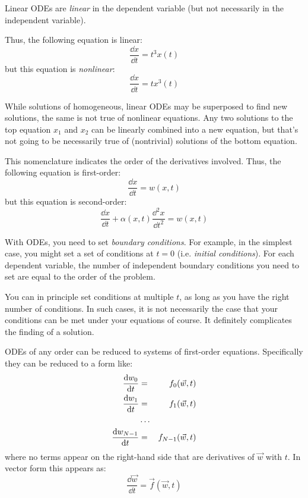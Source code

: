 \begin{answer}
Linear ODEs are {\it linear} in the dependent variable (but not necessarily
in the independent variable). 

Thus, the following equation is linear:
\begin{equation}
\frac{\dd{x}}{\dd{t}} = t^3 x(t)
\end{equation}
but this equation is {\it nonlinear}:
\begin{equation}
\frac{\dd{x}}{\dd{t}} = t x^3(t)
\end{equation}

While solutions of homogeneous, linear ODEs may be superposed to find
new solutions, the same is not true of nonlinear equations.  Any two
solutions to the top equation $x_1$ and $x_2$ can be linearly combined
into a new equation, but that's not going to be necessarily true of
(nontrivial) solutions of the bottom equation.
\end{answer}


\begin{answer}
This nomenclature indicates the order of the derivatives involved.
Thus, the following equation is first-order:
\begin{equation}
\frac{\dd{x}}{\dd{t}} = w(x, t)
\end{equation}
but this equation is second-order:
\begin{equation}
  \frac{\dd{x}}{\dd{t}}
  + \alpha(x, t) \frac{\dd^2{x}}{\dd{t}^2}
  = w(x, t)
\end{equation}
\end{answer}

With ODEs, you need to set {\it boundary conditions}. For example, in
the simplest case, you might set a set of conditions at $t=0$
(i.e. {\it initial conditions}). For each dependent variable, the
number of independent boundary conditions you need to set are equal to
the order of the problem. 

You can in principle set conditions at multiple $t$, as long as you
have the right number of conditions. In such cases, it is not
necessarily the case that your conditions can be met under your
equations of course. It definitely complicates the finding of a
solution.  

ODEs of any order can be reduced to systems of first-order
equations. Specifically they can be reduced to a form like:
\begin{eqnarray}
\frac{{\rm d}w_0}{{\rm d}t} &=& f_0(\vec{w}, t) \cr
\frac{{\rm d}w_1}{{\rm d}t} &=& f_1(\vec{w}, t) \cr
&\ldots& \cr
\frac{{\rm d}w_{N-1}}{{\rm d}t} &=& f_{N-1}(\vec{w}, t)
\end{eqnarray}
where no terms appear on the right-hand side that are derivatives of
$\vec{w}$ with $t$.  In vector form this appears as:
\begin{equation}
\frac{\dd{\vec{w}}}{\dd{t}} = \vec{f}(\vec{w}, t)
\end{equation}


